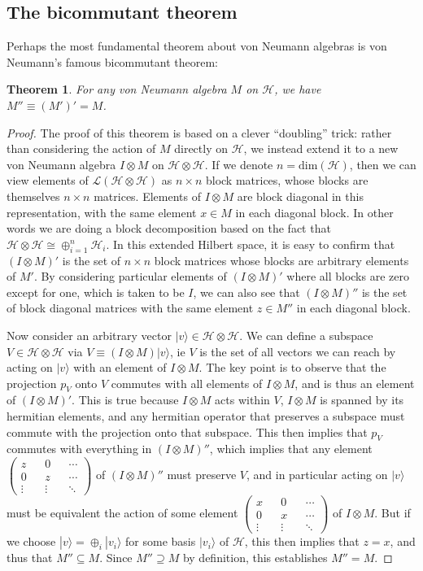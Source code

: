 \documentclass[12pt]{article}
\newcommand{\ran}{\rangle}
\newcommand{\Ll}{\mathcal{L}}
\newcommand{\Hh}{\mathcal{H}}
\newtheorem{thm}{Theorem}[section]
\begin{document}
\subsection{The bicommutant theorem}
Perhaps the most fundamental theorem about von Neumann algebras is von Neumann's famous bicommutant theorem:
\begin{thm}
For any von Neumann algebra $M$ on $\Hh$, we have $M'' \equiv (M')'=M$.
\end{thm}
\begin{proof}
The proof of this theorem is based on a clever ``doubling'' trick: rather than considering the action of $M$ directly on $\Hh$, we instead extend it to a new von Neumann algebra $I\otimes M$ on $\Hh\otimes \Hh$.  If we denote $n=\mathrm{dim}(\Hh)$, then we can view elements of $\Ll(\Hh\otimes \Hh)$ as $n\times n$ block matrices, whose blocks are themselves $n\times n$ matrices.  Elements of $I\otimes M$ are block diagonal in this representation, with the same element $x\in M$ in each diagonal block.  In other words we are doing a block decomposition based on the fact that $\Hh \otimes \Hh \cong \oplus_{i=1}^n \Hh_i$.  In this extended Hilbert space, it is easy to confirm that $(I\otimes M)'$ is the set of $n\times n$ block matrices whose blocks are arbitrary elements of $M'$.  By considering particular elements of $(I\otimes M)'$ where all blocks are zero except for one, which is taken to be $I$, we can also see that $(I\otimes M)''$ is the set of block diagonal matrices with the same element $z \in M''$ in each diagonal block.

Now consider an arbitrary vector $|v\ran\in \Hh\otimes\Hh$. We can define a subspace $V\in \Hh\otimes \Hh$ via $V\equiv(I\otimes M)|v\ran$, ie $V$ is the set of all vectors we can reach by acting on $|v\ran$ with an element of $I\otimes M$.  The key point is to observe that the projection $p_V$ onto $V$ commutes with all elements of $I\otimes M$, and is thus an element of $(I\otimes M)'$.  This is true because $I\otimes M$ acts within $V$, $I\otimes M$ is spanned by its hermitian elements, and any hermitian operator that preserves a subspace must commute with the projection onto that subspace.  This then implies that $p_V$ commutes with everything in $(I\otimes M)''$, which implies that any element $\begin{pmatrix} z &&0 &&\cdots\\ 0 &&z && \cdots \\ \vdots &&\vdots&&\ddots  \end{pmatrix}$ of $(I\otimes M)''$ must preserve $V$, and in particular acting on $|v\ran$ must be equivalent the action of some element $\begin{pmatrix} x &&0 &&\cdots\\ 0 &&x && \cdots \\ \vdots &&\vdots&&\ddots  \end{pmatrix}$ of $I\otimes M$.  But if we choose $|v\ran=\oplus_i |v_i\ran$ for some basis $|v_i\ran$ of $\Hh$, this then implies that $z=x$, and thus that $M''\subseteq M$.  Since $M''\supseteq M$ by definition, this establishes $M''=M$.
\end{proof}
\end{document}

